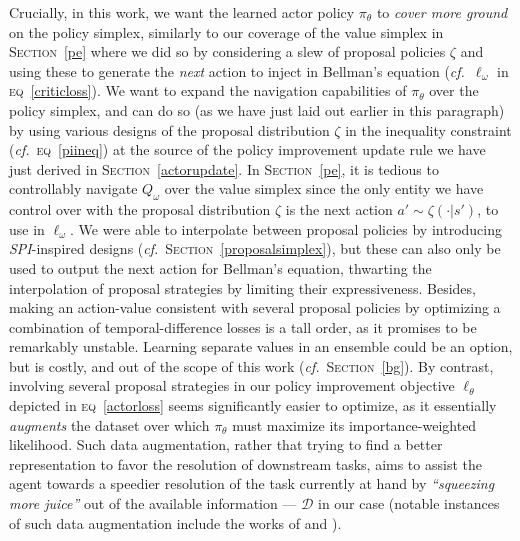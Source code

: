 Crucially, in this work, we want the learned actor policy $\pi_\theta$ to \emph{cover more ground} on
the policy simplex, similarly to our coverage of the value simplex in \textsc{Section}~\ref{pe} where we did so
by considering a slew of proposal policies $\zeta$ and using these to generate the \textit{next} action
to inject in Bellman's equation (\textit{cf.}~$\ell_\omega$ in \textsc{eq}~\ref{criticloss}).
We want to expand the navigation capabilities of $\pi_\theta$ over the policy simplex, and can do so
(as we have just laid out earlier in this paragraph) by using various designs of the proposal distribution
$\zeta$ in the inequality constraint (\textit{cf.}~\textsc{eq}~\ref{piineq}) at the source of the
policy improvement update rule we have just derived in \textsc{Section}~\ref{actorupdate}.
In \textsc{Section}~\ref{pe}, it is tedious to controllably navigate $Q_\omega$ over the value simplex
since the only entity we have control over with the proposal distribution $\zeta$ is the next action
$a' \sim \zeta(\cdot | s')$, to use in $\ell_\omega$.
We were able to interpolate between proposal policies by introducing \textit{SPI}-inspired designs
(\textit{cf.}~\textsc{Section}~\ref{proposalsimplex}),
but these can also only be used to output the next action for Bellman's equation, thwarting the
interpolation of proposal strategies by limiting their expressiveness.
Besides, making an action-value consistent with several proposal policies by optimizing a
combination of temporal-difference losses is a tall order, as it promises to be remarkably unstable.
Learning separate values in an ensemble could be an option, but is costly, and out of the scope of this work
(\textit{cf.}~\textsc{Section}~\ref{bg}).
By contrast, involving several proposal strategies
in our policy improvement objective $\ell_\theta$ depicted in \textsc{eq}~\ref{actorloss}
seems significantly easier to optimize,
as it essentially \emph{augments} the dataset over which $\pi_\theta$ must maximize its
importance-weighted likelihood.
Such data augmentation, rather that trying to find a better representation to favor the resolution of
downstream tasks, aims to assist the agent towards a speedier resolution of the task currently at hand
by \textit{``squeezing more juice''} out of the available information --- $\mathcal{D}$ in our case
(notable instances of such data augmentation include the works of
\cite{Kaelbling1993-dv} and \cite{Andrychowicz2017-mn}).

